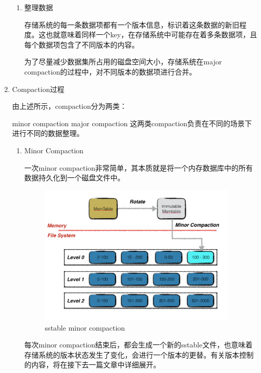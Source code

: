 \begin{enumerate}
\begin{enumerate}
				\item 整理数据
				
				存储系统的每一条数据项都有一个版本信息，标识着这条数据的新旧程度。这也就意味着同样一个key，在存储系统中可能存在着多条数据项，且每个数据项包含了不同版本的内容。
				
				为了尽量减少数据集所占用的磁盘空间大小，存储系统在major compaction的过程中，对不同版本的数据项进行合并。
				
				
				
			\end{enumerate}

			\item Compaction过程 
			
			由上述所示，compaction分为两类：
				
				minor compaction
				major compaction
				这两类compaction负责在不同的场景下进行不同的数据整理。
			\begin{enumerate}
				\item Minor Compaction
				
				一次minor compaction非常简单，其本质就是将一个内存数据库中的所有数据持久化到一个磁盘文件中。
				
				\begin{figure}[H]
					\centering
					\includegraphics[width=0.95\textwidth]{images/minor_compaction.jpeg}
					\caption{sstable minor compaction}
					\label{sstable_minor_compaction}
				\end{figure}
				
				每次minor compaction结束后，都会生成一个新的sstable文件，也意味着存储系统的版本状态发生了变化，会进行一个版本的更替。有关版本控制的内容，将在接下去一篇文章中详细展开。
				

\end{enumerate}
\end{enumerate}

